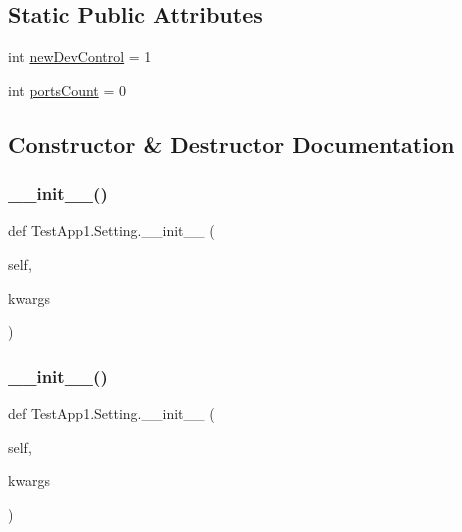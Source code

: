 \subsection*{Static Public Attributes}
\begin{DoxyCompactItemize}
\item 
int \hyperlink{classTestApp1_1_1Setting_a1d6a014b27d0b35e08440f82f606ec4a}{new\+Dev\+Control} = 1
\item 
int \hyperlink{classTestApp1_1_1Setting_ac239309579e700d31ce489ed32557200}{ports\+Count} = 0
\end{DoxyCompactItemize}


\subsection{Constructor \& Destructor Documentation}
\mbox{\label{classTestApp1_1_1Setting_a74bad58507816fbeaff1fc4179897de7}} 
\subsubsection{\texorpdfstring{\+\_\+\+\_\+init\+\_\+\+\_\+()}{\_\_init\_\_()}\hspace{0.1cm}{\footnotesize\ttfamily [1/2]}}
{\footnotesize\ttfamily def Test\+App1.\+Setting.\+\_\+\+\_\+init\+\_\+\+\_\+ (\begin{DoxyParamCaption}\item[{}]{self,  }\item[{}]{kwargs }\end{DoxyParamCaption})}

\mbox{\label{classTestApp1_1_1Setting_a74bad58507816fbeaff1fc4179897de7}} 
\subsubsection{\texorpdfstring{\+\_\+\+\_\+init\+\_\+\+\_\+()}{\_\_init\_\_()}\hspace{0.1cm}{\footnotesize\ttfamily [2/2]}}
{\footnotesize\ttfamily def Test\+App1.\+Setting.\+\_\+\+\_\+init\+\_\+\+\_\+ (\begin{DoxyParamCaption}\item[{}]{self,  }\item[{}]{kwargs }\end{DoxyParamCaption})}



